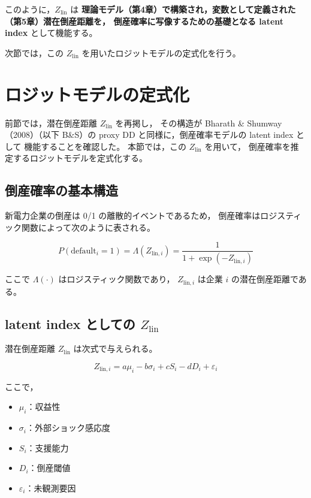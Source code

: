 このように，$Z_{\text{lin}}$ は
\textbf{理論モデル（第4章）で構築され，変数として定義された（第5章）潜在倒産距離を，
倒産確率に写像するための基礎となる latent index}
として機能する。

次節では，この $Z_{\text{lin}}$ を用いたロジットモデルの定式化を行う。



\section{ロジットモデルの定式化}

前節では，潜在倒産距離 $Z_{\text{lin}}$ を再掲し，
その構造が Bharath \& Shumway（2008）（以下 B\&S）の
proxy DD と同様に，倒産確率モデルの latent index として
機能することを確認した。
本節では，この $Z_{\text{lin}}$ を用いて，
倒産確率を推定するロジットモデルを定式化する。

\subsection{倒産確率の基本構造}

新電力企業の倒産は 0/1 の離散的イベントであるため，
倒産確率はロジスティック関数によって次のように表される。



\[
P(\text{default}_i = 1)
= \Lambda(Z_{\text{lin},i})
= \frac{1}{1 + \exp(-Z_{\text{lin},i})}
\]



ここで $\Lambda(\cdot)$ はロジスティック関数であり，
$Z_{\text{lin},i}$ は企業 $i$ の潜在倒産距離である。

\subsection*{latent index としての $Z_{\text{lin}}$}

潜在倒産距離 $Z_{\text{lin}}$ は次式で与えられる。



\[
Z_{\text{lin},i}
= a\mu_i - b\sigma_i + cS_i - dD_i + \varepsilon_i
\]



ここで，

\begin{itemize}
    \item $\mu_i$：収益性
    \item $\sigma_i$：外部ショック感応度
    \item $S_i$：支援能力
    \item $D_i$：倒産閾値
    \item $\varepsilon_i$：未観測要因
\end{itemize}

